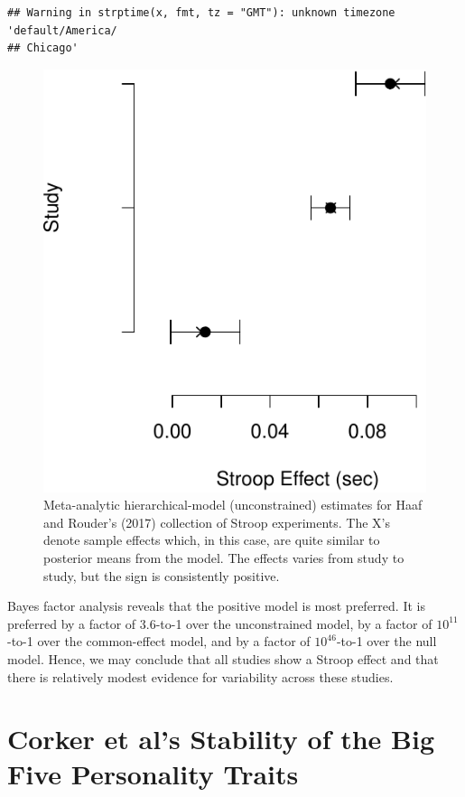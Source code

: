 \documentclass[english,man]{apa6}
\theoremstyle{definition}
\theoremstyle{definition}
\theoremstyle{definition}
\theoremstyle{remark}
\begin{document}
\begin{verbatim}
## Warning in strptime(x, fmt, tz = "GMT"): unknown timezone 'default/America/
## Chicago'
\end{verbatim}

\begin{figure}[htbp]
\centering
\includegraphics{p_files/figure-latex/hrEst-1.pdf}
\caption{\label{fig:hrEst}Meta-analytic hierarchical-model (unconstrained)
estimates for Haaf and Rouder's (2017) collection of Stroop experiments.
The X's denote sample effects which, in this case, are quite similar to
posterior means from the model. The effects varies from study to study,
but the sign is consistently positive.}
\end{figure}

Bayes factor analysis reveals that the positive model is most preferred.
It is preferred by a factor of 3.6-to-1 over the unconstrained model, by
a factor of \(10^{11}\)-to-1 over the common-effect model, and by a
factor of \(10^{46}\)-to-1 over the null model. Hence, we may conclude
that all studies show a Stroop effect and that there is relatively
modest evidence for variability across these studies.

\section{Corker et al's Stability of the Big Five Personality
Traits}\label{corker-et-als-stability-of-the-big-five-personality-traits}
\end{document}
